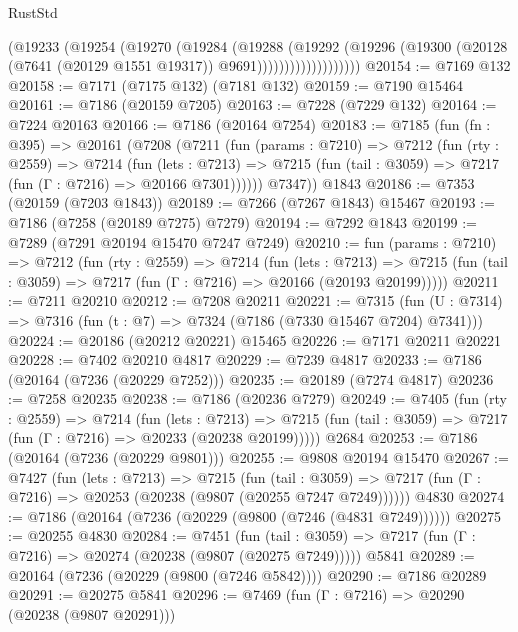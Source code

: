 \begin{lexlean}{RustStd}
\begin{coremodule}
{\begin{coremodule}
{{{{{{{{{{{{{{{{{{{{{{{{{{{{{{{{                        (@19233
                          (@19254
                            (@19270
                              (@19284
                                (@19288
                                  (@19292
                                    (@19296
                                      (@19300
                                        (@20128
                                          (@7641 (@20129 @1551 @19317))
                                          @9691)))))))))))))))))))
@20154 := @7169 @132
@20158 := @7171 (@7175 @132) (@7181 @132)
@20159 := @7190 @15464
@20161 := @7186 (@20159 @7205)
@20163 := @7228 (@7229 @132)
@20164 := @7224 @20163
@20166 := @7186 (@20164 @7254)
@20183 := @7185
    (fun (fn : @395) =>
    @20161
      (@7208
        (@7211
          (fun (params : @7210) =>
          @7212
            (fun (rty : @2559) =>
            @7214
              (fun (lets : @7213) =>
              @7215 (fun (tail : @3059) => @7217 (fun (Γ : @7216) => @20166 @7301))))))
        @7347))
    @1843
@20186 := @7353 (@20159 (@7203 @1843))
@20189 := @7266 (@7267 @1843) @15467
@20193 := @7186 (@7258 (@20189 @7275) @7279)
@20194 := @7292 @1843
@20199 := @7289 (@7291 @20194 @15470 @7247 @7249)
@20210 := fun (params : @7210) =>
  @7212
    (fun (rty : @2559) =>
    @7214
      (fun (lets : @7213) =>
      @7215 (fun (tail : @3059) => @7217 (fun (Γ : @7216) => @20166 (@20193 @20199)))))
@20211 := @7211 @20210
@20212 := @7208 @20211
@20221 := @7315
    (fun (U : @7314) => @7316 (fun (t : @7) => @7324 (@7186 (@7330 @15467 @7204) @7341)))
@20224 := @20186 (@20212 @20221) @15465
@20226 := @7171 @20211 @20221
@20228 := @7402 @20210 @4817
@20229 := @7239 @4817
@20233 := @7186 (@20164 (@7236 (@20229 @7252)))
@20235 := @20189 (@7274 @4817)
@20236 := @7258 @20235
@20238 := @7186 (@20236 @7279)
@20249 := @7405
    (fun (rty : @2559) =>
    @7214
      (fun (lets : @7213) =>
      @7215 (fun (tail : @3059) => @7217 (fun (Γ : @7216) => @20233 (@20238 @20199)))))
    @2684
@20253 := @7186 (@20164 (@7236 (@20229 @9801)))
@20255 := @9808 @20194 @15470
@20267 := @7427
    (fun (lets : @7213) =>
    @7215
      (fun (tail : @3059) =>
      @7217 (fun (Γ : @7216) => @20253 (@20238 (@9807 (@20255 @7247 @7249))))))
    @4830
@20274 := @7186 (@20164 (@7236 (@20229 (@9800 (@7246 (@4831 @7249))))))
@20275 := @20255 @4830
@20284 := @7451
    (fun (tail : @3059) => @7217 (fun (Γ : @7216) => @20274 (@20238 (@9807 (@20275 @7249)))))
    @5841
@20289 := @20164 (@7236 (@20229 (@9800 (@7246 @5842))))
@20290 := @7186 @20289
@20291 := @20275 @5841
@20296 := @7469 (fun (Γ : @7216) => @20290 (@20238 (@9807 @20291)))
}}}}}}}}}}}}}}}}}}}}}}}}}}}}}}}}
\end{coremodule}}
\end{coremodule}
\end{lexlean}
